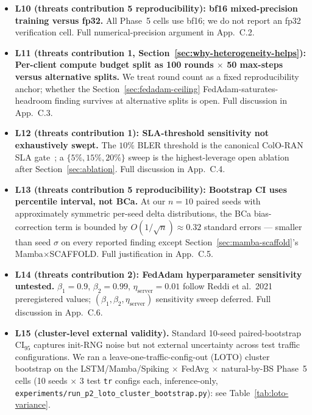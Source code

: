 \documentclass[journal]{IEEEtran}
\begin{document}
\begin{itemize}
  \item \textbf{L10 (threats contribution 5 reproducibility): bf16 mixed-precision training versus fp32.} All Phase~5 cells use bf16; we do not report an fp32 verification cell. Full numerical-precision argument in App.~C.2.

  \item \textbf{L11 (threats contribution 1, Section~\ref{sec:why-heterogeneity-helps}): Per-client compute budget split as 100 rounds $\times$ 50 max-steps versus alternative splits.} We treat round count as a fixed reproducibility anchor; whether the Section~\ref{sec:fedadam-ceiling} FedAdam-saturates-headroom finding survives at alternative splits is open. Full discussion in App.~C.3.

  \item \textbf{L12 (threats contribution 1): SLA-threshold sensitivity not exhaustively swept.} The $10\%$ BLER threshold is the canonical ColO-RAN SLA gate~\cite{Polese2022}; a $\{5\%, 15\%, 20\%\}$ sweep is the highest-leverage open ablation after Section~\ref{sec:ablation}. Full discussion in App.~C.4.

  \item \textbf{L13 (threats contribution 5 reproducibility): Bootstrap CI uses percentile interval, not BCa.} At our $n = 10$ paired seeds with approximately symmetric per-seed delta distributions, the BCa bias-correction term is bounded by $O(1/\sqrt{n}) \approx 0.32$ standard errors --- smaller than seed $\sigma$ on every reported finding except Section~\ref{sec:mamba-scaffold}'s Mamba$\times$SCAFFOLD. Full justification in App.~C.5.

  \item \textbf{L14 (threats contribution 2): FedAdam hyperparameter sensitivity untested.} $\beta_1 = 0.9$, $\beta_2 = 0.99$, $\eta_{\mathrm{server}} = 0.01$ follow Reddi et al.~2021~\cite{Reddi2021_FedAdam} preregistered values; $(\beta_1, \beta_2, \eta_{\mathrm{server}})$ sensitivity sweep deferred. Full discussion in App.~C.6.

  \item \textbf{L15 (cluster-level external validity).} Standard 10-seed paired-bootstrap CI$_{95}$ captures init-RNG noise but not external uncertainty across test traffic configurations. We ran a leave-one-traffic-config-out (LOTO) cluster bootstrap on the LSTM/Mamba/Spiking $\times$ FedAvg $\times$ natural-by-BS Phase~5 cells (10 seeds $\times$ 3 test \lstinline|tr| configs each, inference-only, \lstinline|experiments/run_p2_loto_cluster_bootstrap.py|): see Table~\ref{tab:loto-variance}.


\end{itemize}
\end{document}
